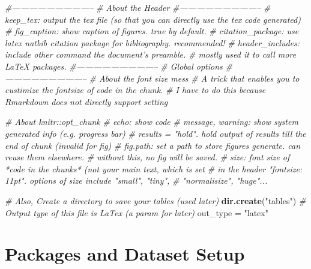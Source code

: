 \documentclass[11pt,]{article}
\newenvironment{Shaded}{\begin{snugshade}}{\end{snugshade}}
\newcommand{\KeywordTok}[1]{\textcolor[rgb]{0.13,0.29,0.53}{\textbf{#1}}}
\newcommand{\StringTok}[1]{\textcolor[rgb]{0.31,0.60,0.02}{#1}}
\newcommand{\CommentTok}[1]{\textcolor[rgb]{0.56,0.35,0.01}{\textit{#1}}}
\newcommand{\NormalTok}[1]{#1}
\begin{document}
\tiny

\begin{Shaded}
\begin{Highlighting}[]
\CommentTok{#-----------------------------}
\CommentTok{# About the Header}
\CommentTok{#-----------------------------}
  \CommentTok{# keep_tex: output the tex file (so that you can directly use the tex code generated)}
  \CommentTok{# fig_caption: show caption of figures. true by default.}
  \CommentTok{# citation_package: use latex natbib citation package for bibliography. recommended!}
  \CommentTok{# header_includes: include other command the document's preamble.}
  \CommentTok{#                  mostly used it to call more LaTeX packages.}
\CommentTok{#-----------------------------}
\CommentTok{# Global options}
\CommentTok{#-----------------------------}
  \CommentTok{# About the font size mess}
    \CommentTok{# A trick that enables you to custimize the fontsize of code in the chunk.}
    \CommentTok{# I have to do this because Rmarkdown does not directly support setting}

  \CommentTok{# About knitr::opt_chunk}
    \CommentTok{# echo: show code}
    \CommentTok{# message, warning: show system generated info (e.g. progress bar)}
    \CommentTok{# results = "hold". hold output of results till the end of chunk (invalid for fig)}
    \CommentTok{# fig.path: set a path to store figures generate. can reuse them elsewhere.}
    \CommentTok{#           without this, no fig will be saved.}
    \CommentTok{# size: font size of *code in the chunks* (not your main text, which is set}
    \CommentTok{#       in the header "fontsize: 11pt". options of size include "small", "tiny",}
    \CommentTok{#       "normalisize", "huge"...}

  \CommentTok{# Also, Create a directory to save your tables (used later)}
  \KeywordTok{dir.create}\NormalTok{(}\StringTok{"tables"}\NormalTok{)}
  \CommentTok{# Output type of this file is LaTex (a param for later)}
\NormalTok{  out_type =}\StringTok{ "latex"}
\end{Highlighting}
\end{Shaded}

\normalsize

\section{Packages and Dataset Setup}\label{packages-and-dataset-setup}

\tiny
\end{document}
